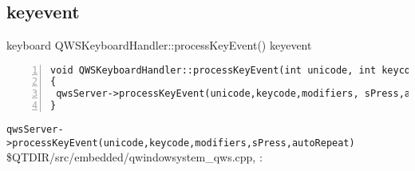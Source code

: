 \chapter{{\MaQ{}}}
\section{keyevent {\MbQ{}}}
keyboard {\MbQ{}} QWSKeyboardHandler::processKeyEvent()
{\MaQ{}} keyevent{\MaQ{}}\zZ

\begin{lstlisting}[tabsize=1,basicstyle=\footnotesize,frame=single,frameround=tttt,numbers=left,breaklines=true,title=\$QTDIR/src/embedded/qkbd\_{}qws.cpp]
void QWSKeyboardHandler::processKeyEvent(int unicode, int keycode, int modifiers, bool isPress, bool autoRepeat)
{
 qwsServer->processKeyEvent(unicode,keycode,modifiers, sPress,autoRepeat );
}
\end{lstlisting}

\verb+qwsServer->processKeyEvent(unicode,keycode,modifiers,sPress,autoRepeat)+
{\MbQ{}} \$QTDIR/src/embedded/qwindowsystem\_{}qws.cpp,
{\MaQ{}}:

